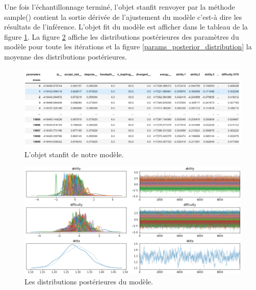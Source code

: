 Une fois l’échantillonnage terminé, l’objet \colorbox{gray!30}{stanfit} renvoyer par la méthode \colorbox{gray!30}{sample()} contient la sortie dérivée de l’ajustement du modèle c’est-à dire les résultats de l’inférence. L’objet \colorbox{gray!30}{fit} du modèle est afficher dans le tableau de la figure \ref{stanfit_object}. La figure \ref{model_trace-plot} affiche les distributions postérieures des paramètres du modèle pour toute les itérations et la figure \ref{params_posterior_distribution} la moyenne des distributions postérieures.
\begin{figure}[H]
	\begin{center}
		\includegraphics[width=\textwidth]{images/chapitre7/stanfit_object.png}
	\end{center}
	\caption{L’objet stanfit de notre modèle.}
	\label{stanfit_object}
\end{figure}


\begin{figure}[H]
	\begin{center}
		\includegraphics[width=\textwidth]{images/chapitre7/model_plot-trace.png}
	\end{center}
	\caption{Les distributions postérieures du modèle.}
	\label{model_trace-plot}
\end{figure}

